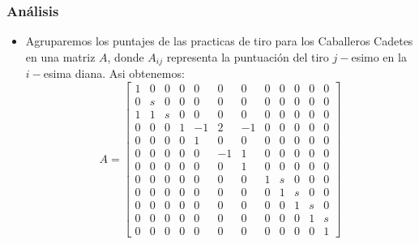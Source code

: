 \documentclass[utf8,spanish,xcolor={svgnames},12pt,handout]{beamer}
\begin{document}
\begin{frame}
	\frametitle{Análisis}
	\begin{itemize}
		
		\item Agruparemos los puntajes de las practicas de tiro para los Caballeros Cadetes en una matriz $A$, donde $A_{ij}$ representa la puntuación del tiro $j-$esimo en la $i-$esima diana. Asi obtenemos:
		\vspace*{-0.2cm}
		\setcounter{MaxMatrixCols}{20}
		\begin{equation}\label{item1}
		A = \begin{bmatrix}
		1& 0& 0& 0&  0&  0&  0& 0& 0& 0& 0& 0\\
		0& s& 0& 0&  0&  0&  0& 0& 0& 0& 0& 0\\
		1& 1& s& 0&  0&  0&  0& 0& 0& 0& 0& 0\\
		0& 0& 0& 1& -1&  2& -1& 0& 0& 0& 0& 0\\
		0& 0& 0& 0&  1&  0&  0& 0& 0& 0& 0& 0\\
		0& 0& 0& 0&  0& -1&  1& 0& 0& 0& 0& 0\\
		0& 0& 0& 0&  0&  0&  1& 0& 0& 0& 0& 0\\
		0& 0& 0& 0&  0&  0&  0& 1& s& 0& 0& 0\\
		0& 0& 0& 0&  0&  0&  0& 0& 1& s& 0& 0\\
		0& 0& 0& 0&  0&  0&  0& 0& 0& 1& s& 0\\
		0& 0& 0& 0&  0&  0&  0& 0& 0& 0& 1& s\\
		0& 0& 0& 0&  0&  0&  0& 0& 0& 0& 0& 1
		\end{bmatrix}
		\end{equation}
	\end{itemize}
\end{frame}
\end{document}

